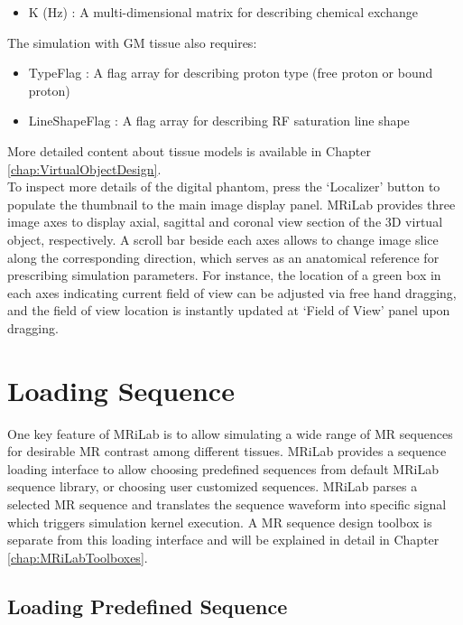 \documentclass{book}%
\begin{document}
\begin{itemize}
	\item K (Hz) : A multi-dimensional matrix for describing chemical exchange
\end{itemize}

The simulation with GM tissue also requires:

\begin{itemize}
	\item TypeFlag : A flag array for describing proton type (free proton or bound proton)
	\item LineShapeFlag : A flag array for describing RF saturation line shape
\end{itemize}

More detailed content about tissue models is available in Chapter \ref{chap:VirtualObjectDesign}.\\

To inspect more details of the digital phantom, press the `Localizer' button to populate the thumbnail to the main image display panel. MRiLab provides three image axes to display axial, sagittal and coronal view section of the 3D virtual object, respectively. A scroll bar beside each axes allows to change image slice along the corresponding direction, which serves as an anatomical reference for prescribing simulation parameters. For instance, the location of a green box in each axes indicating current field of view can be adjusted via free hand dragging, and the field of view location is instantly updated at `Field of View' panel upon dragging.

\section{Loading Sequence}
One key feature of MRiLab is to allow simulating a wide range of MR sequences for desirable MR contrast among different tissues. MRiLab provides a sequence loading interface to allow choosing predefined sequences from default MRiLab sequence library, or choosing user customized sequences. MRiLab parses a selected MR sequence and translates the sequence waveform into specific signal which triggers simulation kernel execution. A MR sequence design toolbox is separate from this loading interface and will be explained in detail in Chapter \ref{chap:MRiLabToolboxes}.

\subsection{Loading Predefined Sequence}
\end{document}
